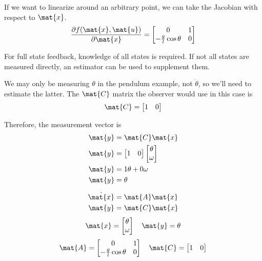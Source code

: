 If we want to linearize around an arbitrary point, we can take the Jacobian with
respect to $\mat{x}$.
\begin{equation*}
  \frac{\partial f(\mat{x}, \mat{u})}{\partial\mat{x}} =
  \begin{bmatrix}
    0 & 1 \\
    -\frac{g}{l}\cos\theta & 0
  \end{bmatrix}
\end{equation*}

For full \gls{state} feedback, knowledge of all \glspl{state} is required. If
not all \glspl{state} are measured directly, an estimator can be used to
supplement them.

We may only be measuring $\theta$ in the pendulum example, not $\dot{\theta}$,
so we'll need to estimate the latter. The $\mat{C}$ matrix the \gls{observer}
would use in this case is
\begin{equation*}
  \mat{C} = \begin{bmatrix}
    1 & 0 \\
  \end{bmatrix}
\end{equation*}

Therefore, the measurement vector is
\begin{align*}
  \mat{y} &= \mat{C}\mat{x} \\
  \mat{y} &= \begin{bmatrix}
    1 & 0
  \end{bmatrix}
  \begin{bmatrix}
    \theta \\
    \omega
  \end{bmatrix} \\
  \mat{y} &= 1\theta + 0\omega \\
  \mat{y} &= \theta
\end{align*}
\begin{theorem}
  \begin{align*}
    \dot{\mat{x}} &= \mat{A} \mat{x} \\
    \mat{y} &= \mat{C} \mat{x}
  \end{align*}
  \begin{equation*}
    \mat{x} =
    \begin{bmatrix}
      \theta \\
      \omega
    \end{bmatrix}
    \quad
    \mat{y} = \theta
  \end{equation*}
  \begin{equation}
    \mat{A} =
    \begin{bmatrix}
      0 & 1 \\
      -\frac{g}{l}\cos\theta & 0
    \end{bmatrix}
    \quad
    \mat{C} =
    \begin{bmatrix}
      1 & 0
    \end{bmatrix}
  \end{equation}
\end{theorem}

